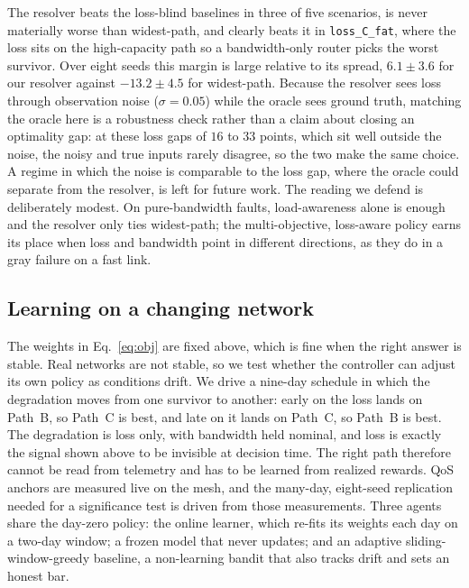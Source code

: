 \documentclass[conference]{IEEEtran}
\begin{document}
The resolver beats the loss-blind baselines in three of five scenarios, is never
materially worse than widest-path, and clearly beats it in \texttt{loss\_C\_fat},
where the loss sits on the high-capacity path so a bandwidth-only router picks the
worst survivor. Over eight seeds this margin is large relative to its spread,
$6.1\pm3.6$ for our resolver against $-13.2\pm4.5$ for widest-path. Because the
resolver sees loss through observation noise ($\sigma=0.05$) while the oracle sees
ground truth, matching the oracle here is a robustness check rather than a claim about
closing an optimality gap: at these loss gaps of $16$ to $33$ points, which sit well
outside the noise, the noisy and true inputs rarely disagree, so the two make the same
choice. A regime in which the noise is comparable to the loss gap, where the oracle
could separate from the resolver, is left for future work. The reading we defend is
deliberately modest. On
pure-bandwidth faults, load-awareness alone is enough and the resolver only ties
widest-path; the multi-objective, loss-aware policy earns its place when loss and
bandwidth point in different directions, as they do in a gray failure on a fast link.

\subsection{Learning on a changing network}
\label{sec:learn}
The weights in Eq.~\eqref{eq:obj} are fixed above, which is fine when the right answer
is stable. Real networks are not stable, so we test whether the controller can adjust
its own policy as conditions drift. We drive a nine-day schedule in which the
degradation moves from one survivor to another: early on the loss lands on Path~B, so
Path~C is best, and late on it lands on Path~C, so Path~B is best. The degradation is
loss only, with bandwidth held nominal, and loss is exactly the signal shown above to
be invisible at decision time. The right path therefore cannot be read from
telemetry and has to be learned from realized rewards. QoS anchors are measured live
on the mesh, and the many-day, eight-seed replication needed for a significance test
is driven from those measurements. Three agents share the day-zero policy: the online
learner, which re-fits its weights each day on a two-day window; a frozen model that
never updates; and an adaptive sliding-window-greedy baseline, a non-learning bandit
that also tracks drift and sets an honest bar.
\end{document}
